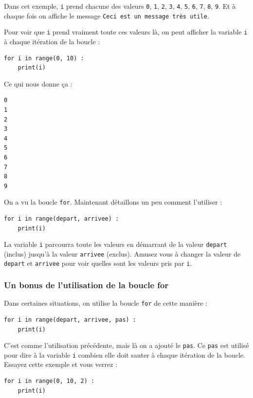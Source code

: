 \documentclass[12pt]{article}
\newcommand{\code}[1]{\colorbox{light-gray}{\texttt{#1}}}
\begin{document}
            Dans cet exemple, \code{i} prend chacune des valeurs \code{0}, \code{1}, \code{2}, \code{3}, \code{4}, \code{5},
            \code{6}, \code{7}, \code{8}, \code{9}. Et à chaque fois on affiche le message \code{Ceci est un
            message très utile}.

            Pour voir que \code{i} prend vraiment toute ces valeurs là, on peut afficher la variable \code{i} à chaque
            itération de la boucle :
            \begin{lstlisting}[style=code]
for i in range(0, 10) :
    print(i)
            \end{lstlisting}

            Ce qui nous donne ça :
            \begin{lstlisting}[style=exec_result]
0
1
2
3
4
5
6
7
8
9
            \end{lstlisting}

            On a vu la boucle \code{for}. Maintenant détaillons un peu comment l'utiliser :
            \begin{lstlisting}[style=code]
for i in range(depart, arrivee) :
    print(i)
            \end{lstlisting}

            La variable \code{i} parcourra toute les valeurs en démarrant de la valeur \code{depart} (inclus)
            jusqu'à la valeur \code{arrivee} (exclus). Amusez vous à changer la valeur de \code{depart}
            et \code{arrivee} pour voir quelles sont les valeurs pris par \code{i}.

        \subsubsection{Un bonus de l'utilisation de la boucle for}

            Dans certaines situations, on utilise la boucle \code{for} de cette manière :
            \begin{lstlisting}[style=code]
for i in range(depart, arrivee, pas) :
    print(i)
            \end{lstlisting}

            C'est comme l'utilisation précédente, mais là on a ajouté le \code{pas}. Ce \code{pas} est utilisé pour dire à
            la variable \code{i} combien elle doit sauter à chaque itération de la boucle. Essayez cette exemple et vous
            verrez :
            \begin{lstlisting}[style=code]
for i in range(0, 10, 2) :
    print(i)
            \end{lstlisting}
\end{document}
